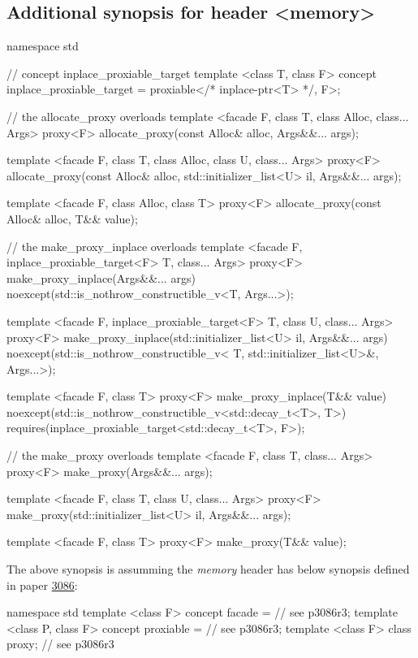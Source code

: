 \documentclass[10pt, a4paper, oneside]{article}
\begin{document}
\subsection{Additional synopsis for header \textless memory\textgreater}

\begin{codeblock}
namespace std {
  // concept inplace\_proxiable\_target
  template <class T, class F>
  concept inplace_proxiable_target = proxiable</* inplace-ptr<T> */, F>;

  // the allocate\_proxy overloads
  template <facade F, class T, class Alloc, class... Args>
  proxy<F> allocate_proxy(const Alloc& alloc, Args&&... args);

  template <facade F, class T, class Alloc, class U, class... Args>
  proxy<F> allocate_proxy(const Alloc& alloc, std::initializer_list<U> il, Args&&... args);

  template <facade F, class Alloc, class T>
  proxy<F> allocate_proxy(const Alloc& alloc, T&& value);

  // the make\_proxy\_inplace overloads
  template <facade F, inplace_proxiable_target<F> T, class... Args>
  proxy<F> make_proxy_inplace(Args&&... args)
      noexcept(std::is_nothrow_constructible_v<T, Args...>);

  template <facade F, inplace_proxiable_target<F> T, class U, class... Args>
  proxy<F> make_proxy_inplace(std::initializer_list<U> il, Args&&... args)
      noexcept(std::is_nothrow_constructible_v<
          T, std::initializer_list<U>&, Args...>);

  template <facade F, class T>
  proxy<F> make_proxy_inplace(T&& value)
      noexcept(std::is_nothrow_constructible_v<std::decay_t<T>, T>)
      requires(inplace_proxiable_target<std::decay_t<T>, F>);

  // the make\_proxy overloads
  template <facade F, class T, class... Args>
  proxy<F> make_proxy(Args&&... args);
  
  template <facade F, class T, class U, class... Args>
  proxy<F> make_proxy(std::initializer_list<U> il, Args&&... args);
  
  template <facade F, class T>
  proxy<F> make_proxy(T&& value);
}
\end{codeblock}

\noindent The above synopsis is assumming the \textit{memory} header has below synopsis defined in paper \href{https://wg21.link/p3086}{3086}:
\begin{codeblock}
namespace std {
  template <class F>
    concept facade = // see p3086r3;
  template <class P, class F>
    concept proxiable = // see p3086r3;
  template <class F>
    class proxy; // see p3086r3
}

\end{codeblock}
\end{document}
